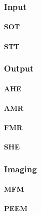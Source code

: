 \subsubsection{Input}
\paragraph{SOT}
\cite{SOT_FM_AFM,SOTswitchingCoPt,SOT_Roadmap,vlasov2022optimal}
\paragraph{STT} %
\subsubsection{Output}
\paragraph{AHE} %
\cite{AHE,AHE_Culcer}
\paragraph{AMR} %
\paragraph{FMR} %
\paragraph{SHE} %
\cite{SHE}
\subsubsection{Imaging} %
\paragraph{MFM} %
\paragraph{PEEM}
